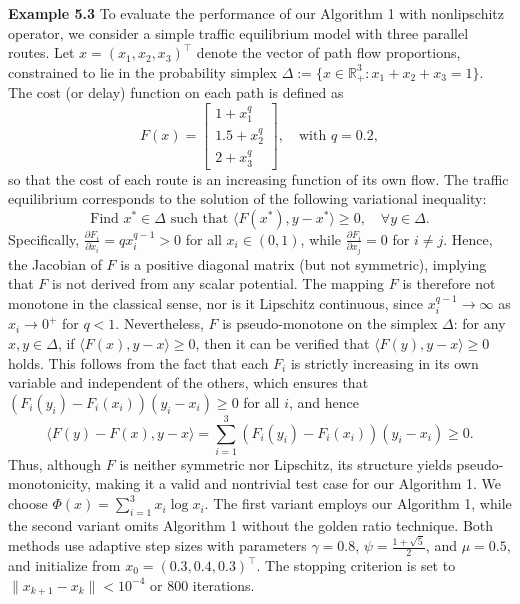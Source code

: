 \documentclass[hidelinks,11 pt]{article}
\numberwithin{equation}{section}
\theoremstyle{definition}  %
\numberwithin{equation}{section}
\numberwithin{theorem}{section}
\begin{document}
\vskip 2mm 
\textbf{Example 5.3} \quad To evaluate the performance of our Algorithm 1 with nonlipschitz operator, we consider a simple traffic equilibrium model with three parallel routes. Let \( x = (x_1, x_2, x_3)^\top \) denote the vector of path flow proportions, constrained to lie in the probability simplex \( \Delta := \{ x \in \mathbb{R}^3_+ : x_1 + x_2 + x_3 = 1 \} \). The cost (or delay) function on each path is defined as
\[
F(x) = \begin{bmatrix}
1 + x_1^q \\
1.5 + x_2^q \\
2 + x_3^q
\end{bmatrix}, \quad \text{with } q = 0.2,
\]
so that the cost of each route is an increasing function of its own flow. The traffic equilibrium corresponds to the solution of the following variational inequality:
\[
\text{Find } x^* \in \Delta \text{ such that } \langle F(x^*), y - x^* \rangle \geq 0, \quad \forall y \in \Delta.
\]
Specifically, \( \frac{\partial F_i}{\partial x_i} = q x_i^{q-1} > 0 \) for all \( x_i \in (0,1) \), while \( \frac{\partial F_i}{\partial x_j} = 0 \) for \( i \neq j \). Hence, the Jacobian of \( F \) is a positive diagonal matrix (but not symmetric), implying that \( F \) is not derived from any scalar potential. The mapping \( F \) is therefore not monotone in the classical sense, nor is it Lipschitz continuous, since \( x_i^{q-1} \to \infty \) as \( x_i \to 0^+ \) for \( q < 1 \). Nevertheless, \( F \) is pseudo-monotone on the simplex \( \Delta \): for any \( x, y \in \Delta \), if \( \langle F(x), y - x \rangle \geq 0 \), then it can be verified that \( \langle F(y), y - x \rangle \geq 0 \) holds. This follows from the fact that each \( F_i \) is strictly increasing in its own variable and independent of the others, which ensures that \( (F_i(y_i) - F_i(x_i))(y_i - x_i) \geq 0 \) for all \( i \), and hence
\[
\langle F(y) - F(x), y - x \rangle = \sum_{i=1}^3 (F_i(y_i) - F_i(x_i))(y_i - x_i) \geq 0.
\]
Thus, although \( F \) is neither symmetric nor Lipschitz, its structure yields pseudo-monotonicity, making it a valid and nontrivial test case for our Algorithm 1. We choose \( \Phi(x) = \sum_{i=1}^3 x_i \log x_i \). The first variant employs our Algorithm 1, while the second variant omits Algorithm 1 without the golden ratio technique. Both methods use adaptive step sizes with parameters \( \gamma = 0.8 \), \( \psi = \frac{1 + \sqrt{5}}{2} \), and \( \mu = 0.5 \), and initialize from \( x_0 = (0.3, 0.4, 0.3)^\top \). The stopping criterion is set to \( \|x_{k+1} - x_k\| < 10^{-4} \) or 800 iterations. 
\end{document}
